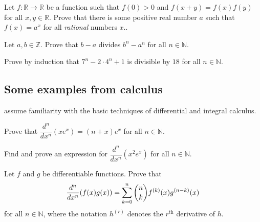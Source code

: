 \begin{chapex}
Let $f : \mathbb{R} \to \mathbb{R}$ be a function such that $f(0) > 0$ and $f(x+y)=f(x)f(y)$ for all $x,y \in \mathbb{R}$. Prove that there is some positive real number $a$ such that $f(x)=a^x$ for all \textit{rational} numbers $x$..
\end{chapex}

\begin{chapex}
Let $a,b \in \mathbb{Z}$. Prove that $b-a$ divides $b^n-a^n$ for all $n \in \mathbb{N}$.
\end{chapex}

\begin{chapex}
Prove by induction that $7^n - 2 \cdot 4^n + 1$ is divisible by $18$ for all $n \in \mathbb{N}$.
\end{chapex}

\subsection*{Some examples from calculus}

 assume familiarity with the basic techniques of differential and integral calculus.

\begin{chapex}
\label{cqCalculusBegin}
Prove that $\dfrac{d^n}{dx^n}(xe^x) = (n+x)e^x$ for all $n \in \mathbb{N}$.
\end{chapex}

\begin{chapex}
Find and prove an expression for $\dfrac{d^n}{dx^n}(x^2e^x)$ for all $n \in \mathbb{N}$.
\end{chapex}

\begin{chapex}
Let $f$ and $g$ be differentiable functions. Prove that
\[ \dfrac{d^n}{dx^n}(f(x)g(x)) = \sum_{k=0}^n \dbinom{n}{k} f^{(k)}(x) g^{(n-k)}(x) \]
for all $n \in \mathbb{N}$, where the notation $h^{(r)}$ denotes the $r^{\text{th}}$ derivative of $h$.
\end{chapex}

